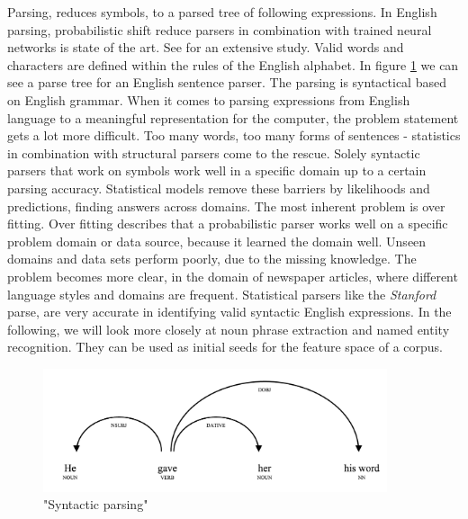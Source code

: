   Parsing, reduces symbols, to a parsed tree of following expressions. In English parsing, probabilistic shift reduce parsers in combination with trained neural networks is state of the art. See \cite{ShiftReduceParsingStanford} for an extensive study. Valid words and characters are defined within the rules of the English alphabet. In figure \ref{syntactic_parsing} we can see a parse tree for an English sentence parser. The parsing is syntactical based on English grammar. When it comes to parsing expressions from English language to a meaningful representation for the computer, the problem statement gets a lot more difficult. Too many words, too many forms of sentences - statistics in combination with structural parsers come to the rescue. Solely syntactic parsers that work on symbols work well in a specific domain up to a certain parsing accuracy. Statistical models remove these barriers by likelihoods and predictions, finding answers across domains. The most inherent problem is over fitting. Over fitting describes that a probabilistic parser works well on a specific problem domain or data source, because it learned the domain well. Unseen domains and data sets perform poorly, due to the missing knowledge. The problem becomes more clear, in the domain of newspaper articles, where different language styles and domains are frequent. Statistical parsers like the \emph{Stanford} parse, are very accurate in identifying valid syntactic English expressions. In the following, we will look more closely at noun phrase extraction and named entity recognition. They can be used as initial seeds for the feature space of a corpus.

    \begin{figure}[h!]
      \centering
        \includegraphics[width=0.9\textwidth]{sentence_structure.png}
        \caption{"Syntactic parsing"}
        \label{syntactic_parsing}
    \end{figure} 

